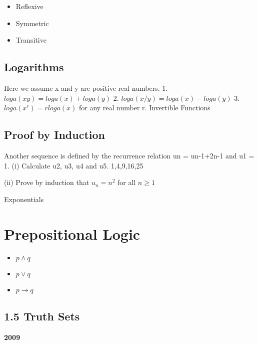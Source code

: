 \documentclass[]{report}
\begin{document}
\begin{itemize} 
	\item Reflexive
	\item Symmetric
	\item Transitive
\end{itemize}

\subsection{Logarithms}


Here we
assume x and y are positive real numbers.
1. $loga(xy) = loga(x) + loga(y)$
2. $loga(x/y)= loga(x) - loga(y)$
3. $loga (x^r) = r loga(x)$ for any real number r.
Invertible Functions

\subsection{Proof by Induction}

Another sequence is defined by the recurrence relation un = un-1+2n-1 and
u1 = 1.
(i) Calculate u2, u3, u4 and u5.
1,4,9,16,25

(ii) Prove by induction that $u_n = n^2$ for all $n \geq 1$

Exponentials
\newpage

\section*{Prepositional Logic}


\begin{itemize}
	\item $p \wedge q$
	\item $p \vee q$
	\item $p \rightarrow q$
\end{itemize}
\newpage
\subsection*{1.5 Truth Sets}
\textbf{2009} 
\end{document}

